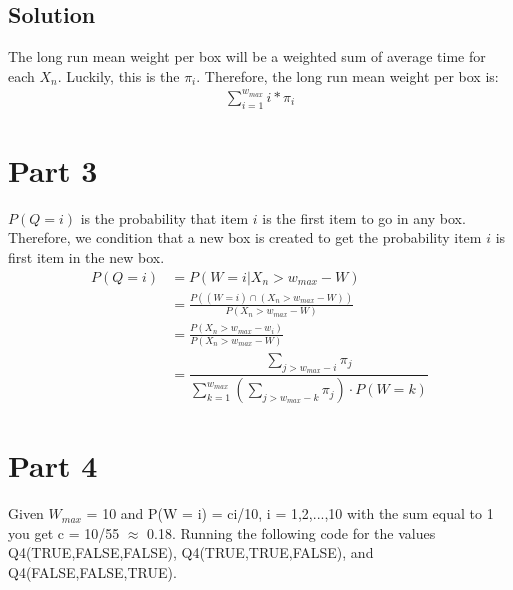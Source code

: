 \documentclass[10pt,a4paper]{article}
\begin{document}
\subsection{Solution}
The long run mean weight per box will be a weighted sum of average time for each $X_n$. Luckily, this is the $\pi_i$. Therefore, the long run mean weight per box is:
\begin{align*}
\sum_{i=1}^{w_{max}} i*\pi_i
\end{align*}


\section{Part 3}
$P(Q=i)$ is the probability that item $i$ is the first item to go in any box. Therefore, we condition that a new box is created to get the probability item $i$ is first item in the new box.\\

\begin{align*}
P(Q=i) &= P(W=i | X_n > w_{max} - W) \\
&= \frac{P( ( W=i ) \cap (X_n > w_{max} - W))}{P(X_n > w_{max} - W)}\\
&= \frac{P(X_n > w_{max} -w_i)}{P(X_n > w_{max} - W)} \\
&= \dfrac{\sum\limits_{j > w_{max} - i} \pi_j }{\sum\limits_{k=1}^{w_{max}} \left(\sum\limits_{j > w_{max} -k} \pi_j \right) \cdot P(W=k)}
\end{align*}

\section{Part 4}
Given $W_{max}$ = 10 and P(W = i) = ci/10, i = 1,2,...,10 with the sum equal to 1 you get c = 10/55 $\approx$ 0.18. Running the following code for the values Q4(TRUE,FALSE,FALSE), Q4(TRUE,TRUE,FALSE), and Q4(FALSE,FALSE,TRUE).
 
\end{document}
